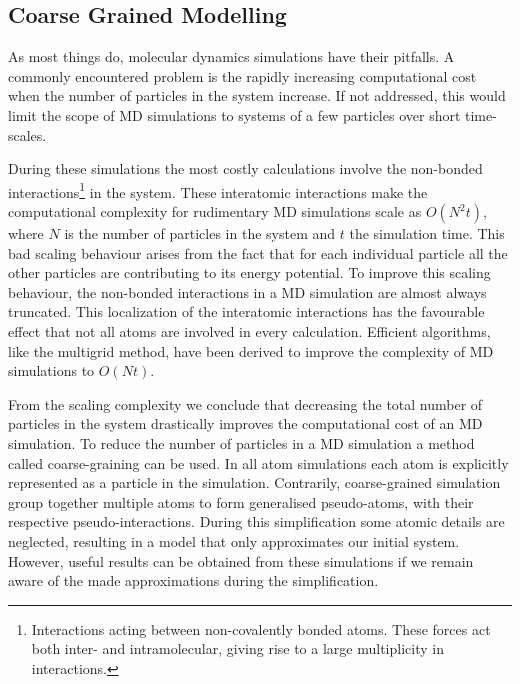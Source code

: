 \subsection{Coarse Grained Modelling}
As most things do, molecular dynamics simulations have their pitfalls. A commonly
encountered problem is the rapidly increasing computational cost when the number of
particles in the system increase. If not addressed, this would limit the scope of MD
simulations to systems of a few particles over short time-scales.

During these simulations the most costly calculations involve the non-bonded
interactions\footnote{Interactions acting between non-covalently bonded atoms. These
forces act both inter- and intramolecular, giving rise to a large multiplicity in
interactions.} in the system. These interatomic interactions make the computational
complexity for rudimentary MD simulations scale as $O(N^2t)$, where $N$ is the number of
particles in the system and $t$ the simulation time. This bad scaling behaviour arises
from the fact that for each individual particle all the other particles are
contributing to its energy potential. To improve this scaling behaviour, the non-bonded
interactions in a MD simulation are almost always truncated. This localization of the
interatomic interactions has the favourable effect that not all atoms are involved in
every calculation. Efficient algorithms, like the multigrid method, have been derived
to improve the complexity of MD simulations to $O(Nt)$.\cite{Celeste2001}

From the scaling complexity we conclude that decreasing the total number of particles in
the system drastically improves the computational cost of an MD simulation. To reduce the
number of particles in a MD simulation a method called coarse-graining can be used.
In all atom simulations each atom is explicitly represented as a particle in the
simulation. Contrarily, coarse-grained simulation group together multiple atoms to form
generalised pseudo-atoms, with their respective pseudo-interactions. During this
simplification some atomic details are neglected, resulting in a model that only
approximates our initial system. However, useful results can be obtained from
these simulations if we remain aware of the made approximations during the
simplification.


